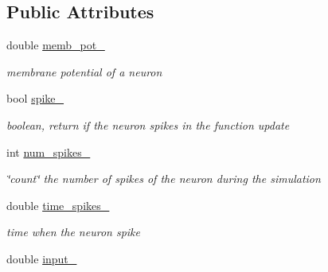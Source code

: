 \subsection*{Public Attributes}
\begin{DoxyCompactItemize}
\item 
\hypertarget{classNeuron_aec16bc28dca5791ac5d033cc9a55dab3}{double \hyperlink{classNeuron_aec16bc28dca5791ac5d033cc9a55dab3}{memb\-\_\-pot\-\_\-}}\label{classNeuron_aec16bc28dca5791ac5d033cc9a55dab3}

\begin{DoxyCompactList}\small\item\em membrane potential of a neuron \end{DoxyCompactList}\item 
\hypertarget{classNeuron_ae8ea5214f54fffb663fa502e73a4274a}{bool \hyperlink{classNeuron_ae8ea5214f54fffb663fa502e73a4274a}{spike\-\_\-}}\label{classNeuron_ae8ea5214f54fffb663fa502e73a4274a}

\begin{DoxyCompactList}\small\item\em boolean, return if the neuron spikes in the function update \end{DoxyCompactList}\item 
\hypertarget{classNeuron_a827cc8dee5f9f71ed3d6c0542c339a6f}{int \hyperlink{classNeuron_a827cc8dee5f9f71ed3d6c0542c339a6f}{num\-\_\-spikes\-\_\-}}\label{classNeuron_a827cc8dee5f9f71ed3d6c0542c339a6f}

\begin{DoxyCompactList}\small\item\em \char`\"{}count\char`\"{} the number of spikes of the neuron during the simulation \end{DoxyCompactList}\item 
\hypertarget{classNeuron_a23eee7236d51e80b97911d6f32d15324}{double \hyperlink{classNeuron_a23eee7236d51e80b97911d6f32d15324}{time\-\_\-spikes\-\_\-}}\label{classNeuron_a23eee7236d51e80b97911d6f32d15324}

\begin{DoxyCompactList}\small\item\em time when the neuron spike \end{DoxyCompactList}\item 
\hypertarget{classNeuron_a9ed47eb032d964fdebc77bca888226fa}{double \hyperlink{classNeuron_a9ed47eb032d964fdebc77bca888226fa}{input\-\_\-}}\label{classNeuron_a9ed47eb032d964fdebc77bca888226fa}


\end{DoxyCompactItemize}
